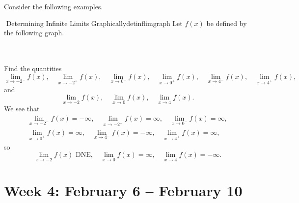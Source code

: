        \pagebreak
        \vphantom
        \\
        \\
        Consider the following examples.
        \begin{example}{\Stop\,\,Determining Infinite Limits Graphically}{detinflimgraph}
            Let \(f(x)\) be defined by the following graph.
            \begin{center}
            \end{center}
            \vphantom
            \\
            \\
            Find the quantities
            \begin{equation*}
                \lim_{x\to -2^-}f(x),\quad \lim_{x\to -2^+}f(x),\quad \lim_{x\to 0^-}f(x),\quad \lim_{x\to 0^+}f(x),\quad \lim_{x\to 4^-}f(x),\quad \lim_{x\to 4^+}f(x),
            \end{equation*}
            and
            \begin{equation*}
                \lim_{x\to -2}f(x),\quad \lim_{x\to 0}f(x),\quad \lim_{x\to 4}f(x).
            \end{equation*}
            We see that
            \begin{align*}
                \lim_{x\to -2^-}f(x)=-\infty,\quad \lim_{x\to -2^+}f(x)=\infty,\quad \lim_{x\to 0^-}f(x)=\infty, \\ \lim_{x\to 0^+}f(x)=\infty,\quad \lim_{x\to 4^-}f(x)=-\infty,\quad \lim_{x\to 4^+}f(x)=\infty,
            \end{align*}
            so
            \begin{equation*}
                \lim_{x\to -2}f(x)\text{ DNE},\quad \lim_{x\to 0}f(x)=\infty,\quad \lim_{x\to 4}f(x)=-\infty.
            \end{equation*}
        \end{example}


\section{Week 4: February 6 -- February 10}